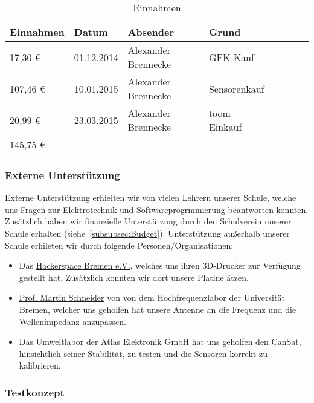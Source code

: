 \begin{table}[htbp]
  \centering
  \caption{Einnahmen}
    \begin{tabular}{p{}p{}p{}p{}rrrl}
    \toprule
    \multicolumn{1}{c}{\textbf{Einnahmen}} & \textbf{Datum} & \textbf{Absender} & \textbf{Grund} \\
    \midrule
              17,30 \euro  & 01.12.2014 & Alexander Brennecke & GFK-Kauf \\
           107,46 \euro  & 10.01.2015 & Alexander Brennecke & Sensorenkauf \\
              20,99 \euro  & 23.03.2015 & Alexander Brennecke & toom Einkauf \\
    \bottomrule
    145,75 \euro & & & \\
    \bottomrule
    \end{tabular}%
  \label{tab:budgeteinnahmen}%
\end{table}%

\subsubsection{Externe Unterstützung}
Externe Unterstützung erhielten wir von vielen Lehrern unserer Schule, welche uns Fragen zur Elektrotechnik und Softwareprogrmmierung beantworten konnten. Zusätzlich haben wir finanzielle Unterstützung durch den Schulverein unserer Schule erhalten (siehe~\ref{subsubsec:Budget}).
Unterstützung außerhalb unserer Schule erhileten wir durch folgende Personen/Organisationen:

\begin{itemize}
	\item Das \href{https://www.hackerspace-bremen.de/}{Hackerspace Bremen e.V.}, welches uns ihren 3D-Drucker zur Verfügung gestellt hat. Zusätzlich konnten wir dort unsere Platine ätzen.
	\item \href{http://de.wikipedia.org/wiki/Martin_Schneider_(Nachrichtentechniker)} {Prof. Martin Schneider} von von dem Hochfrequenzlabor der Universität Bremen, welcher uns geholfen hat unsere Antenne an die Frequenz und die Wellenimpedanz anzupassen.
	\item  Das Umweltlabor der \href{http://www.atlas-elektronik.com/atlas-elektronik/}{Atlas Elektronik GmbH} hat uns geholfen den CanSat, hinsichtlich seiner Stabilität, zu testen und die Sensoren korrekt zu kalibrieren.
\end{itemize}

\subsubsection{Testkonzept}